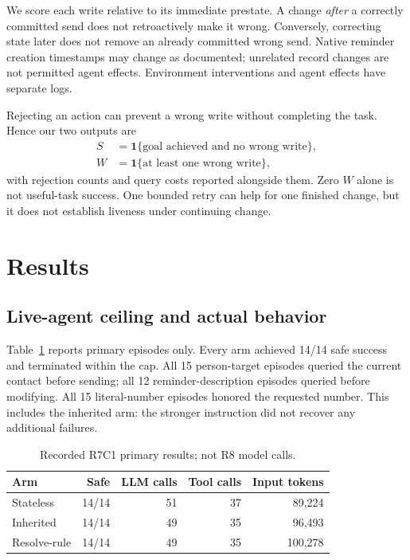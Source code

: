 \documentclass[10pt,letterpaper]{article}
\newcommand{\ind}{\mathbf{1}}
\begin{document}
We score each write relative to its immediate prestate. A change \emph{after} a correctly committed send does not retroactively make it wrong. Conversely, correcting state later does not remove an already committed wrong send. Native reminder creation timestamps may change as documented; unrelated record changes are not permitted agent effects. Environment interventions and agent effects have separate logs.

Rejecting an action can prevent a wrong write without completing the task. Hence our two outputs are
\begin{align}
 S &= \ind\{\text{goal achieved and no wrong write}\},\\
 W &= \ind\{\text{at least one wrong write}\},
\end{align}
with rejection counts and query costs reported alongside them. Zero $W$ alone is not useful-task success. One bounded retry can help for one finished change, but it does not establish liveness under continuing change.

\section{Results}
\subsection{Live-agent ceiling and actual behavior}
Table~\ref{tab:paid} reports primary episodes only. Every arm achieved 14/14 safe success and terminated within the cap. All 15 person-target episodes queried the current contact before sending; all 12 reminder-description episodes queried before modifying. All 15 literal-number episodes honored the requested number. This includes the inherited arm: the stronger instruction did not recover any additional failures.

\begin{table}[t]
\centering\small
\caption{Recorded R7C1 primary results; not R8 model calls.}\label{tab:paid}
\begin{tabular}{lrrrr}
\toprule
Arm & Safe & LLM calls & Tool calls & Input tokens\\
\midrule
Stateless &14/14&51&37&89,224\\
Inherited &14/14&49&35&96,493\\
Resolve-rule &14/14&49&35&100,278\\
\bottomrule
\end{tabular}
\end{table}
\end{document}
